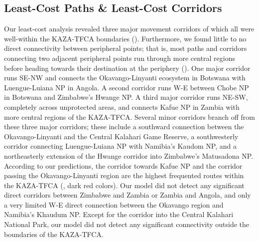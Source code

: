 \documentclass[abstract=on,10pt,a4paper,bibliography=totocnumbered]{article}
\begin{document}
\subsection{Least-Cost Paths \& Least-Cost Corridors}
Our least-cost analysis revealed three major movement corridors of which all
were well-within the KAZA-TFCA boundaries (). Furthermore, we
found little to no direct connectivity between peripheral points; that is, most
paths and corridors connecting two adjacent peripheral points run through more
central regions before heading towards their destination at the periphery
(). One major corridor runs SE-NW and connects the
Okavango-Linyanti ecosystem in Botswana with Luengue-Luiana NP in Angola. A
second corridor runs W-E between Chobe NP in Botswana and Zimbabwe's Hwange NP.
A third major corridor runs NE-SW, completely across unprotected areas, and
connects Kafue NP in Zambia with more central regions of the KAZA-TFCA. Several
minor corridors branch off from these three major corridors; these include a
southward connection between the Okavango-Linyanti and the Central Kalahari Game
Reserve, a southwesterly corridor connecting Luengue-Luiana NP with Namibia's
Kaudom NP, and a northeasterly extension of the Hwange corridor into Zimbabwe's
Matusadona NP. According to our predictions, the corridor towards Kafue NP and
the corridor passing the Okavango-Linyanti region are the highest frequented
routes within the KAZA-TFCA (, dark red colors). Our model did
not detect any significant direct corridors between Zimbabwe and Zambia or
Zambia and Angola, and only a very limited W-E direct connection between the
Okavango region and Namibia's Khaudum NP. Except for the corridor into the
Central Kalahari National Park, our model did not detect any significant
connectivity outside the boundaries of the KAZA-TFCA.
\end{document}
